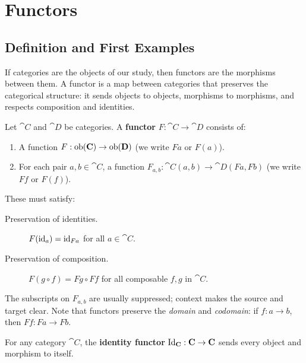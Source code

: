 \chapter{Functors}
\label{ch:functors}

\section{Definition and First Examples}

If categories are the objects of our study, then functors are the morphisms between them. A functor is a map between categories that preserves the categorical structure: it sends objects to objects, morphisms to morphisms, and respects composition and identities.

\begin{definition}[Functor]
Let $\cat{C}$ and $\cat{D}$ be categories. A \textbf{functor} $F: \cat{C} \to \cat{D}$ consists of:
\begin{enumerate}
  \item A function $F: \operatorname{ob}(\mathbf{C}) \to \operatorname{ob}(\mathbf{D})$ (we write $Fa$ or $F(a)$).
  \item For each pair $a, b \in \cat{C}$, a function $F_{a,b}: \cat{C}(a,b) \to \cat{D}(Fa, Fb)$ (we write $Ff$ or $F(f)$).
\end{enumerate}
These must satisfy:
\begin{description}
  \item[Preservation of identities.] $F(\mathrm{id}_a) = \mathrm{id}_{Fa}$ for all $a \in \cat{C}$.
  \item[Preservation of composition.] $F(g \circ f) = Fg \circ Ff$ for all composable $f, g$ in $\cat{C}$.
\end{description}
\end{definition}

\begin{remark}
The subscripts on $F_{a,b}$ are usually suppressed; context makes the source and target clear. Note that functors preserve the \emph{domain} and \emph{codomain}: if $f: a \to b$, then $Ff: Fa \to Fb$.
\end{remark}

\begin{example}
For any category $\cat{C}$, the \textbf{identity functor} $\mathrm{Id}_{\mathbf{C}}: \mathbf{C} \to \mathbf{C}$ sends every object and morphism to itself.
\end{example}


